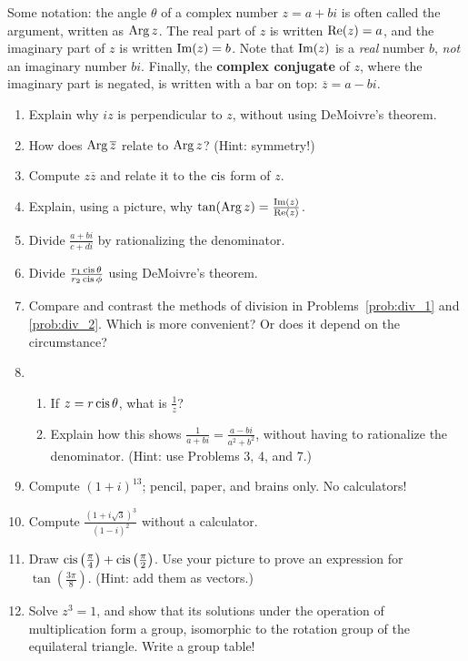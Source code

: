 \documentclass[../gatm.tex]{subfiles}
\begin{document}
Some notation: the angle $\theta$ of a complex number $z = a+bi$ is often called the argument, written as $\operatorname{Arg} z$. The real part of $z$ is written $\operatorname{Re} (z) = a$, and the imaginary part of $z$ is written $\operatorname{Im} (z) = b$. Note that $\operatorname{Im} (z)$ is a \textit{real} number $b$, \textit{not} an imaginary number $bi$. Finally, the \textbf{complex conjugate} of $z$, where the imaginary part is negated, is written with a bar on top: $\overline{z} = a-bi$.

\begin{enumerate}
\item Explain why $iz$ is perpendicular to $z$, without using DeMoivre's theorem.
\item How does $\operatorname{Arg} \overline{z}$ relate to $\operatorname{Arg} z$? (Hint: symmetry!)
\item Compute $z\overline{z}$ and relate it to the $\operatorname{cis}$ form of $z$.
\item Explain, using a picture, why $\tan (\operatorname{Arg} z) = \frac{\operatorname{Im}(z)}{\operatorname{Re}(z)}$.
\item Divide $\frac{a+bi}{c+di}$ by rationalizing the denominator.~\label{prob:div_1}
\item Divide $\frac{r_1\operatorname{cis} \theta}{r_2\operatorname{cis} \phi}$ using DeMoivre's theorem.~\label{prob:div_2}
\item Compare and contrast the methods of division in Problems~\ref{prob:div_1} and \ref{prob:div_2}. Which is more convenient? Or does it depend on the circumstance?
\item \begin{enumerate}
\item If $z = r\operatorname{cis} \theta$, what is $\frac{1}{z}$?
\item Explain how this shows $\frac{1}{a+bi}=\frac{a-bi}{a^2+b^2}$, without having to rationalize the denominator. (Hint: use Problems 3, 4, and 7.)
\end{enumerate}
\item Compute $(1+i)^{13}$; pencil, paper, and brains only. No calculators!
\item Compute $\frac{(1+i\sqrt{3})^3}{(1-i)^2}$ without a calculator.
\item Draw $\operatorname{cis}\left(\frac{\pi}{4}\right) + \operatorname{cis}\left(\frac{\pi}{2}\right)$. Use your picture to prove an expression for $\tan\left(\frac{3\pi}{8}\right)$. (Hint: add them as vectors.)
\item Solve $z^3 = 1$, and show that its solutions under the operation of multiplication form a group, isomorphic to the rotation group of the equilateral triangle. Write a group table!

\end{enumerate}
\end{document}
